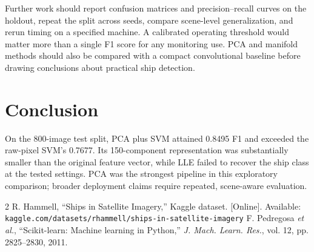 \documentclass[conference]{IEEEtran}
\begin{document}
Further work should report confusion matrices and precision--recall curves on the holdout, repeat the split across seeds, compare scene-level generalization, and rerun timing on a specified machine. A calibrated operating threshold would matter more than a single F1 score for any monitoring use. PCA and manifold methods should also be compared with a compact convolutional baseline before drawing conclusions about practical ship detection.

\section{Conclusion}
On the 800-image test split, PCA plus SVM attained 0.8495 F1 and exceeded the raw-pixel SVM's 0.7677. Its 150-component representation was substantially smaller than the original feature vector, while LLE failed to recover the ship class at the tested settings. PCA was the strongest pipeline in this exploratory comparison; broader deployment claims require repeated, scene-aware evaluation.

\begin{thebibliography}{2}
 R. Hammell, ``Ships in Satellite Imagery,'' Kaggle dataset. [Online]. Available: \texttt{kaggle.com/datasets/rhammell/ships-in-satellite-imagery}
 F. Pedregosa \emph{et al.}, ``Scikit-learn: Machine learning in Python,'' \emph{J. Mach. Learn. Res.}, vol. 12, pp. 2825--2830, 2011.
\end{thebibliography}
\end{document}
